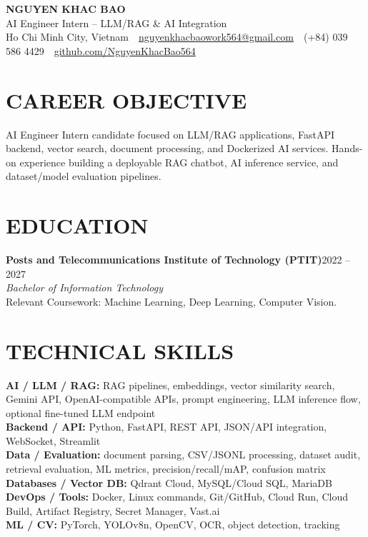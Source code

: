 \documentclass[10pt,a4paper]{article}
\newcommand{\entryhead}[2]{%
    \noindent\textbf{#1}\hfill #2\\[-2pt]
}
\newcommand{\entrysub}[1]{%
    \noindent\textit{#1}\\[-1pt]
}
\begin{document}
\fontsize{8.75}{9.55}\selectfont

\begin{center}
    {\Large\textbf{NGUYEN KHAC BAO}}\\[-1pt]
    AI Engineer Intern -- LLM/RAG \& AI Integration\\[2pt]
    Ho Chi Minh City, Vietnam
    \,\textbar\,
    \href{mailto:nguyenkhacbaowork564@gmail.com}{nguyenkhacbaowork564@gmail.com}
    \,\textbar\,
    (+84) 039 586 4429
    \,\textbar\,
    \href{https://github.com/NguyenKhacBao564}{github.com/NguyenKhacBao564}
\end{center}

\section{CAREER OBJECTIVE}
AI Engineer Intern candidate focused on LLM/RAG applications, FastAPI backend, vector search, document processing, and Dockerized AI services. Hands-on experience building a deployable RAG chatbot, AI inference service, and dataset/model evaluation pipelines.

\section{EDUCATION}
\entryhead{Posts and Telecommunications Institute of Technology (PTIT)}{2022 -- 2027}
\entrysub{Bachelor of Information Technology}
Relevant Coursework: Machine Learning, Deep Learning, Computer Vision.

\section{TECHNICAL SKILLS}
\textbf{AI / LLM / RAG:} RAG pipelines, embeddings, vector similarity search, Gemini API, OpenAI-compatible APIs, prompt engineering, LLM inference flow, optional fine-tuned LLM endpoint\\
\textbf{Backend / API:} Python, FastAPI, REST API, JSON/API integration, WebSocket, Streamlit\\
\textbf{Data / Evaluation:} document parsing, CSV/JSONL processing, dataset audit, retrieval evaluation, ML metrics, precision/recall/mAP, confusion matrix\\
\textbf{Databases / Vector DB:} Qdrant Cloud, MySQL/Cloud SQL, MariaDB\\
\textbf{DevOps / Tools:} Docker, Linux commands, Git/GitHub, Cloud Run, Cloud Build, Artifact Registry, Secret Manager, Vast.ai\\
\textbf{ML / CV:} PyTorch, YOLOv8n, OpenCV, OCR, object detection, tracking
\end{document}
